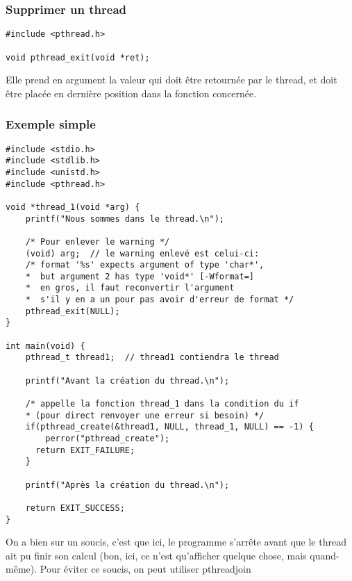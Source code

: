 \documentclass[a4paper]{article}
\begin{document}
\subsubsection{Supprimer un thread}
\begin{lstlisting}
#include <pthread.h>

void pthread_exit(void *ret);
\end{lstlisting}
Elle prend en argument la valeur qui doit être retournée par le thread, et doit être placée en dernière position dans la fonction concernée.
\newpage
\subsubsection{Exemple simple}
\begin{lstlisting}
#include <stdio.h>
#include <stdlib.h>
#include <unistd.h>
#include <pthread.h>

void *thread_1(void *arg) {
    printf("Nous sommes dans le thread.\n");

    /* Pour enlever le warning */
    (void) arg;  // le warning enlevé est celui-ci:
    /* format '%s' expects argument of type 'char*',
    *  but argument 2 has type 'void*' [-Wformat=]
    *  en gros, il faut reconvertir l'argument
    *  s'il y en a un pour pas avoir d'erreur de format */
    pthread_exit(NULL);
}

int main(void) {
    pthread_t thread1;  // thread1 contiendra le thread

    printf("Avant la création du thread.\n");

    /* appelle la fonction thread_1 dans la condition du if
    * (pour direct renvoyer une erreur si besoin) */
    if(pthread_create(&thread1, NULL, thread_1, NULL) == -1) {
	    perror("pthread_create");
      return EXIT_FAILURE;
    }

    printf("Après la création du thread.\n");

    return EXIT_SUCCESS;
}
\end{lstlisting}
On a bien sur un soucis, c'est que ici, le programme s'arrête avant que le thread ait pu finir son calcul (bon, ici, ce n'est qu'afficher quelque chose, mais quand-même). Pour éviter ce soucis, on peut utiliser \guillemotleft{} pthread\textunderscore{}join \guillemotright{}
\end{document}

